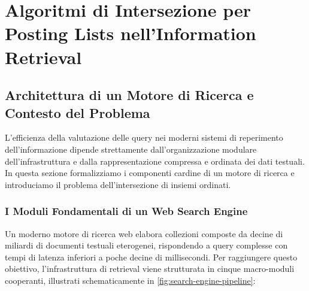 \chapter{Algoritmi di Intersezione per Posting Lists nell'Information Retrieval}
\label{chap:posting-lists-intersection}

\FloatBarrier
\section{Architettura di un Motore di Ricerca e Contesto del Problema}
\label{sec:search-engine-architecture}

L'efficienza della valutazione delle query nei moderni sistemi di reperimento dell'informazione dipende strettamente dall'organizzazione modulare dell'infrastruttura e dalla rappresentazione compressa e ordinata dei dati testuali. In questa sezione formalizziamo i componenti cardine di un motore di ricerca e introduciamo il problema dell'intersezione di insiemi ordinati.

\FloatBarrier
\subsection{I Moduli Fondamentali di un Web Search Engine}
Un moderno motore di ricerca web elabora collezioni composte da decine di miliardi di documenti testuali eterogenei, rispondendo a query complesse con tempi di latenza inferiori a poche decine di millisecondi. Per raggiungere questo obiettivo, l'infrastruttura di retrieval viene strutturata in cinque macro-moduli cooperanti, illustrati schematicamente in \autoref{fig:search-engine-pipeline}:

